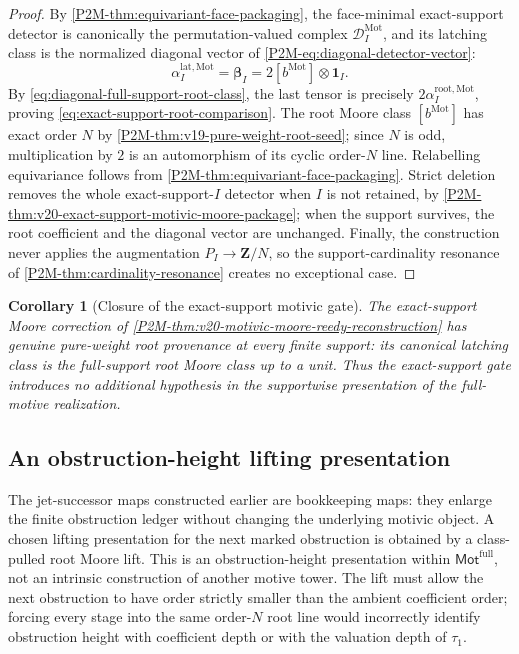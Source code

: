 \documentclass[11pt]{article}
\newtheorem{corollary}[theorem]{Corollary}
\theoremstyle{remark}
\newcommand{\Mot}{\mathrm{Mot}}
\providecommand{\FullMot}{\mathsf{Mot}^{\mathrm{full}}}
\providecommand{\tauone}{\tau_{1}}
\begin{document}
\begin{proof}
By \cref{P2M-thm:equivariant-face-packaging}, the face-minimal exact-support detector is
canonically the permutation-valued complex $\mathcal D_I^{\Mot}$, and its latching class
is the normalized diagonal vector of
\cref{P2M-eq:diagonal-detector-vector}:
\[
 \alpha_I^{\mathrm{lat},\Mot}
 =\boldsymbol\beta_I
 =2[b^{\Mot}]\otimes\mathbf1_I.
\]
By \cref{eq:diagonal-full-support-root-class}, the last tensor is precisely
$2\alpha_I^{\mathrm{root},\Mot}$, proving
\eqref{eq:exact-support-root-comparison}.  The root Moore class $[b^{\Mot}]$ has exact
order $N$ by \cref{P2M-thm:v19-pure-weight-root-seed}; since $N$ is odd, multiplication
by $2$ is an automorphism of its cyclic order-$N$ line.  Relabelling equivariance follows
from \cref{P2M-thm:equivariant-face-packaging}.  Strict deletion removes the whole
exact-support-$I$ detector when $I$ is not retained, by
\cref{P2M-thm:v20-exact-support-motivic-moore-package}; when the support survives, the
root coefficient and the diagonal vector are unchanged.  Finally, the construction
never applies the augmentation $P_I\to\mathbf Z/N$, so the support-cardinality resonance
of \cref{P2M-thm:cardinality-resonance} creates no exceptional case.
\end{proof}

\begin{corollary}[Closure of the exact-support motivic gate]\label{cor:exact-support-gate-closed}
The exact-support Moore correction of
\cref{P2M-thm:v20-motivic-moore-reedy-reconstruction} has genuine pure-weight root
provenance at every finite support: its canonical latching class is the full-support
root Moore class up to a unit.  Thus the exact-support gate introduces no additional
hypothesis in the supportwise presentation of the full-motive realization.
\end{corollary}

\subsection{An obstruction-height lifting presentation}

The jet-successor maps constructed earlier are bookkeeping maps: they enlarge the finite
obstruction ledger without changing the underlying motivic object.  A chosen lifting
presentation for the next marked obstruction is obtained by a class-pulled root Moore
lift.  This is an obstruction-height presentation within \(\FullMot\), not an intrinsic
construction of another motive tower.  The lift must allow the next obstruction to have
order strictly smaller than the ambient coefficient order; forcing every stage into the
same order-$N$ root line would incorrectly identify obstruction height with coefficient
depth or with the valuation depth of \(\tauone\).
\end{document}
